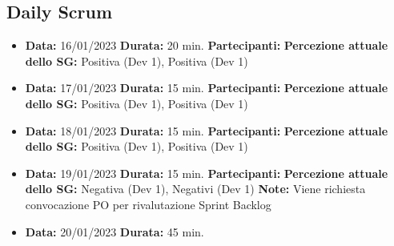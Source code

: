 \begin{landscape}
        \subsection{Daily Scrum}
        \begin{itemize}
            \item \textbf{Data:} 16/01/2023
            \newline \textbf{Durata:} 20 min.
            \newline \textbf{Partecipanti:} \due
            \newline \textbf{Percezione attuale dello SG:} Positiva (Dev 1), Positiva (Dev 1)
        \end{itemize}
        \begin{itemize}
            \item \textbf{Data:} 17/01/2023
            \newline \textbf{Durata:} 15 min.
            \newline \textbf{Partecipanti:} \due
            \newline \textbf{Percezione attuale dello SG:} Positiva (Dev 1), Positiva (Dev 1)
        \end{itemize}
        \begin{itemize}
            \item \textbf{Data:} 18/01/2023
            \newline \textbf{Durata:} 15 min.
            \newline \textbf{Partecipanti:} \due
            \newline \textbf{Percezione attuale dello SG:} Positiva (Dev 1), Positiva (Dev 1)
        \end{itemize}
        \begin{itemize}
            \item \textbf{Data:} 19/01/2023
            \newline \textbf{Durata:} 15 min.
            \newline \textbf{Partecipanti:} \due
            \newline \textbf{Percezione attuale dello SG:} Negativa (Dev 1), Negativi (Dev 1)
            \newline \textbf{Note:} Viene richiesta convocazione PO per rivalutazione Sprint Backlog
        \end{itemize}
        \begin{itemize}
            \item \textbf{Data:} 20/01/2023
            \newline \textbf{Durata:} 45 min.

\end{itemize}
\end{landscape}
